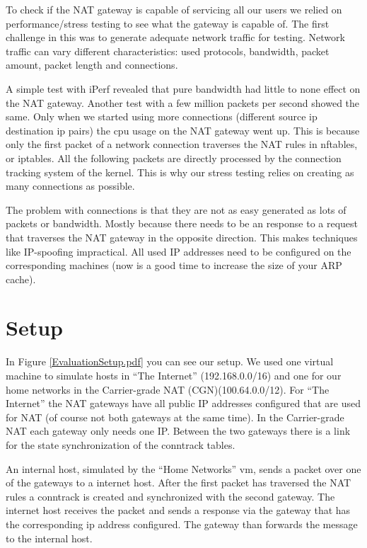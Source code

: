 \documentclass{report}
\begin{document}
To check if the NAT gateway is capable of servicing all our users we
relied on performance/stress testing to see what the gateway is capable
of. The first challenge in this was to generate adequate network traffic
for testing. Network traffic can vary different characteristics: used
protocols, bandwidth, packet amount, packet length and connections.

A simple test with iPerf\cite{iperf} revealed that pure bandwidth had little
to none effect on the NAT gateway. Another test with a few million
packets per second showed the same. Only when we started using more
connections (different source ip destination ip pairs) the cpu usage on
the NAT gateway went up. This is because only the first packet of a
network connection traverses the NAT rules in nftables, or iptables. All
the following packets are directly processed by the connection tracking
system of the kernel. This is why our stress testing relies on creating
as many connections as possible.

The problem with connections is that they are not as easy generated as
lots of packets or bandwidth. Mostly because there needs to be an
response to a request that traverses the NAT gateway in the opposite
direction. This makes techniques like IP-spoofing impractical. All used
IP addresses need to be configured on the corresponding machines (now is
a good time to increase the size of your ARP cache).

\section{Setup}\label{setup-1}

In Figure \ref{EvaluationSetup.pdf} you can see our setup. We used one virtual machine to simulate
hosts in ``The Internet'' (192.168.0.0/16) and one for our home networks
in the Carrier-grade NAT (CGN)(100.64.0.0/12). For ``The Internet'' the
NAT gateways have all public IP addresses configured that are used for
NAT (of course not both gateways at the same time). In the Carrier-grade
NAT each gateway only needs one IP. Between the two gateways there is a
link for the state synchronization of the conntrack tables.

An internal host, simulated by the ``Home Networks'' vm, sends a packet
over one of the gateways to a internet host. After the first packet has
traversed the NAT rules a conntrack is created and synchronized with the
second gateway. The internet host receives the packet and sends a
response via the gateway that has the corresponding ip address
configured. The gateway than forwards the message to the internal host.
\end{document}
